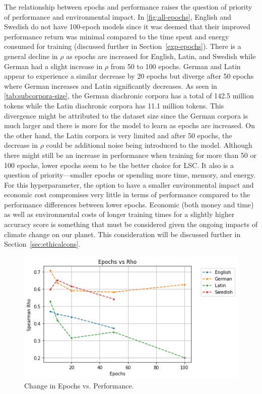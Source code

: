 The relationship between epochs and performance raises the question of priority of performance and environmental impact. In \autoref{fig:all-epochs}, English and Swedish do not have 100-epoch models since it was deemed that their improved performance return was minimal compared to the time spent and energy consumed for training (discussed further in Section~\ref{exp-epochs}). There is a general decline in $\rho$ as epochs are increased for English, Latin, and Swedish while German had a slight increase in $\rho$ from 50 to 100 epochs. German and Latin appear to experience a similar decrease by 20 epochs but diverge after 50 epochs where German increases and Latin significantly decreases. As seen in \autoref{tab:subcorpora-size}, the German diachronic corpora has a total of 142.5 million tokens while the Latin diachronic corpora has 11.1 million tokens. This divergence might be attributed to the dataset size since the German corpora is much larger and there is more for the model to learn as epochs are increased.  On the other hand, the Latin corpora is very limited and after 50 epochs, the decrease in $\rho$ could be additional noise being introduced to the model. Although there might still be an increase in performance when training for more than 50 or 100 epochs, lower epochs seem to be the better choice for LSC. It also is a question of priority—smaller epochs or spending more time, memory, and energy. For this hyperparameter, the option to have a smaller environmental impact and economic cost compromises very little in terms of performance compared to the performance differences between lower epochs. Economic (both money and time) as well as environmental costs of longer training times for a slightly higher accuracy score is something that must be considered given the ongoing impacts of climate change on our planet. This consideration will be discussed further in Section~\ref{sec:ethicalcons}.



\begin{figure}[h]
  \centering
  \includegraphics[width=.8\linewidth]{sections/figures/epochs_all.png}
  \caption{Change in Epochs vs. Performance.}
  \label{fig:all-epochs}
\end{figure}

